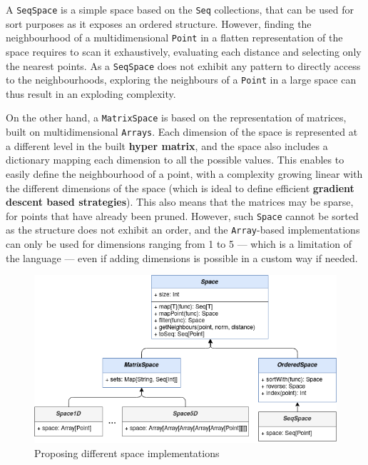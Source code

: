             A \lstinline{SeqSpace} is a simple space based on the \scala{} \lstinline{Seq} collections, that can be used for sort purposes as it exposes an ordered structure.
            However, finding the neighbourhood of a multidimensional \lstinline{Point} in a flatten representation of the space requires to scan it exhaustively, evaluating each distance and selecting only the nearest points.
            As a \lstinline{SeqSpace} does not exhibit any pattern to directly access to the neighbourhoods, exploring the neighbours of a \lstinline{Point} in a large space can thus result in an exploding complexity.

            On the other hand, a \lstinline{MatrixSpace} is based on the \scala{} representation of matrices, built on multidimensional \lstinline{Arrays}. 
            Each dimension of the space is represented at a different level in the built {\bf hyper matrix}, and the space also includes a dictionary mapping each dimension to all the possible values.
            This enables to easily define the neighbourhood of a point, with a complexity growing linear with the different dimensions of the space (which is ideal to define efficient {\bf gradient descent based strategies}).
            This also means that the matrices may be sparse, for points that have already been pruned.
            However, such \lstinline{Space} cannot be sorted as the structure does not exhibit an order, and the \scala{} \lstinline{Array}-based implementations can only be used for dimensions ranging from 1 to 5 --- which is a limitation of the language --- even if adding dimensions is possible in a custom way if needed.

\clearpage
            \begin{figure}[h!]
                \centering
                \includegraphics[width=1.0\textwidth]{Figures/Implementation-Space.png}
                \caption{Proposing different space implementations}
                \label{ch.expe:sec.qece:ssec.impl:fig.space}
            \end{figure}

